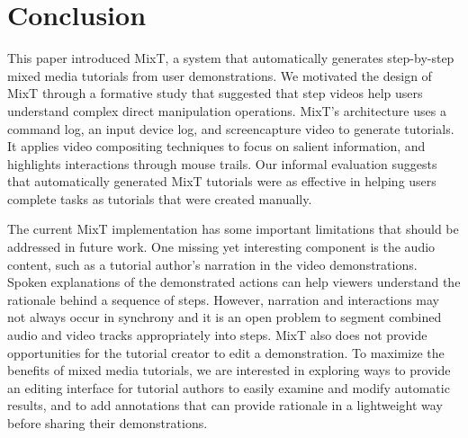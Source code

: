 \section{Conclusion}

This paper introduced MixT, a system that automatically generates step-by-step mixed media tutorials from user demonstrations. We motivated the design of MixT through a formative study that suggested that step videos help users understand complex direct manipulation operations. MixT’s architecture uses a command log, an input device log, and screencapture video to generate tutorials. It applies video compositing techniques to focus on salient information, and highlights interactions through mouse trails. Our informal evaluation suggests that automatically generated MixT tutorials were as effective in helping users complete tasks as tutorials that were created manually.


The current MixT implementation has some important limitations that should be addressed in future work. One missing yet interesting component is the audio content, such as a tutorial author's narration in the video demonstrations. Spoken explanations of the demonstrated actions can help viewers understand the rationale behind a sequence of steps. However, narration and interactions may not always occur in synchrony and it is an open problem to segment combined audio and video tracks appropriately into steps. MixT also does not provide opportunities for the tutorial creator to edit a demonstration. To maximize the benefits of mixed media tutorials, we are interested in exploring ways to provide an editing interface for tutorial authors to easily examine and modify automatic results, and to add annotations that can provide rationale in a lightweight way before sharing their demonstrations.
